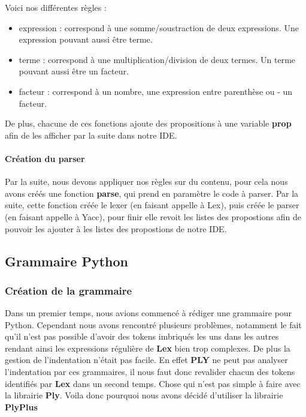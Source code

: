 \documentclass[a4paper,12pt]{article}
\begin{document}
				Voici nos différentes règles : 
				\begin{itemize}
					\item expression : correspond à une somme/soustraction de deux expressions. Une expression pouvant aussi être terme.
					\item terme : correspond à une multiplication/division de deux termes. Un terme pouvant aussi être un facteur.
					\item facteur : correspond à un nombre, une expression entre parenthèse ou - un facteur.
				\end{itemize}

				De plus, chacune de ces fonctions ajoute des propositions à une variable \textbf{prop} afin de les afficher par la suite dans notre IDE.

			\paragraph{Création du parser}

				Par la suite, nous devons appliquer nos règles sur du contenu, pour cela nous avons créés une fonction \textbf{parse}, qui prend en paramètre le code à parser. Par la suite, cette fonction créée le lexer (en faisant appelle à Lex), puis créée le parser (en faisant appelle à Yacc), pour finir elle revoit les listes des propostions afin de pouvoir les ajouter à les listes des propostions de notre IDE.
	
	\subsection{Grammaire Python}

		\subsubsection{Création de la grammaire}

			Dans un premier temps, nous avions commencé à rédiger une grammaire pour Python. Cependant nous avons rencontré plusieurs problèmes, notamment le fait qu'il n'est pas possible d'avoir des tokens imbriqués les uns dans les autres rendant ainsi les expressions régulière de \textbf{Lex} bien trop complexes. De plus la gestion de l'indentation n'était pas facile. En effet \textbf{PLY} ne peut pas analyser l'indentation par ces grammaires, il nous faut donc revalider chacun des tokens identifiés par \textbf{Lex} dans un second temps. Chose qui n'est pas simple à faire avec la librairie \textbf{Ply}. Voila donc pourquoi nous avons décidé d'utiliser la librairie \textbf{PlyPlus}
\end{document}
